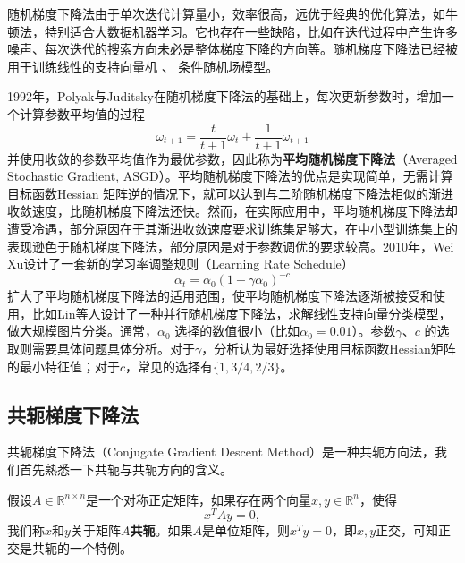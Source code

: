 随机梯度下降法由于单次迭代计算量小，效率很高，远优于经典的优化算法，如牛顿法，特别适合大数据机器学习\cite{bottou2010large}。它也存在一些缺陷，比如在迭代过程中产生许多噪声、每次迭代的搜索方向未必是整体梯度下降的方向等。随机梯度下降法已经被用于训练线性的支持向量机
\cite{shalev2011pegasos}、 条件随机场模型\cite{vishwanathan2006accelerated}。

1992年，Polyak与Juditsky\cite{polyak1992acceleration}在随机梯度下降法的基础上，每次更新参数时，增加一个计算参数平均值的过程
\begin{equation}
    \bar{\omega}_{t+1} = \frac{t}{t+1} \bar{\omega}_t + \frac{1}{t+1} \omega_{t+1}
\end{equation}
并使用收敛的参数平均值作为最优参数，因此称为\textbf{平均随机梯度下降法}（Averaged Stochastic Gradient, ASGD）。平均随机梯度下降法的优点是实现简单，无需计算目标函数Hessian 矩阵逆的情况下，就可以达到与二阶随机梯度下降法相似的渐进收敛速度，比随机梯度下降法还快。然而，在实际应用中，平均随机梯度下降法却遭受冷遇\cite{xu2011towards,lin2011large}，部分原因在于其渐进收敛速度要求训练集足够大，在中小型训练集上的表现逊色于随机梯度下降法，部分原因是对于参数调优的要求较高。2010年，Wei Xu\cite{xu2011towards}设计了一套新的学习率调整规则（Learning Rate Schedule）
\begin{equation}
    \alpha_t = \alpha_0 (1+\gamma\alpha_0)^{-c}
\end{equation}
扩大了平均随机梯度下降法的适用范围，使平均随机梯度下降法逐渐被接受和使用，比如Lin等人\cite{lin2011large}设计了一种并行随机梯度下降法，求解线性支持向量分类模型，做大规模图片分类。通常，$\alpha_0$ 选择的数值很小（比如$\alpha_0=0.01$）。参数$\gamma$、$c$ 的选取则需要具体问题具体分析。对于$\gamma$，\cite{xu2011towards}分析认为最好选择使用目标函数Hessian矩阵的最小特征值；对于$c$，常见的选择有$\{1,3/4,2/3\}$。

\subsection{共轭梯度下降法}
共轭梯度下降法（Conjugate Gradient Descent Method）是一种共轭方向法，我们首先熟悉一下共轭与共轭方向的含义。
\begin{definition}[共轭]
假设$A\in \mathbb{R}^{n\times n}$是一个对称正定矩阵，如果存在两个向量$x,y\in \mathbb{R}^n$，使得
\begin{equation}\label{eq:conjugatedirection1}
    x^T A y = 0,
\end{equation}
我们称$x$和$y$关于矩阵$A$\textbf{共轭}。如果$A$是单位矩阵，则$x^T y = 0$，即$x,y$正交，可知正交是共轭的一个特例。
\end{definition}

